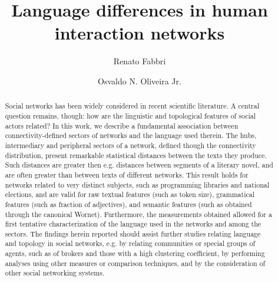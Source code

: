 \documentclass[review]{elsarticle}
\begin{document}
\begin{frontmatter}

\title{Language differences in human interaction networks}

\author[mainaddr]{Renato Fabbri}

\author[secaddr]{Osvaldo N. Oliveira Jr.}

\address[mainaddr]{Institute of Mathematics and Computer Sciences (ICMC/USP) - Avenida Trabalhador São-carlense, 400 - Centro, São Carlos, SP, Brazil}
  \address[secaddr]{São Carlos Institute of Physics (IFSC/USP) - Avenida Trabalhador São-carlense, 400 - Centro, São Carlos, 13566-590, SP, Brazil}

\begin{abstract}
  Social networks has been widely considered in recent scientific literature.
  A central question remains, though: how are the linguistic and topological features of
  social actors related?
  In this work, we describe a fundamental association between connectivity-defined sectors of networks
  and the language used therein.
  The hubs, intermediary and peripheral sectors of a network, defined though the
  connectivity distribution, present remarkable statistical distances between the texts they produce.
  Such distances are greater then e.g. distances between segments of a literary novel,
  and are often greater than between texts of different networks.
  This result holds for networks related to very distinct subjects, such as programming libraries and
  national elections, and are valid for raw textual features (such as token size),
  grammatical features (such as fraction of adjectives), and semantic features
  (such as obtained through the canonical Wornet).
  Furthermore, the measurements obtained allowed for a first tentative characterization of the language used in the networks and among the sectors.
  The findings herein reported should assist further studies relating language and topology
  in social networks, e.g. by relating communities or special groups of agents, such as of brokers
   and those with a high clustering coefficient, by performing analyses using other measures or comparison techniques, and by the consideration of other social networking systems.
\end{abstract}


\end{frontmatter}
\end{document}
